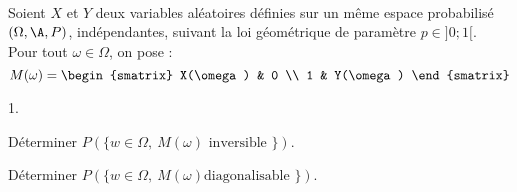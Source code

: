 \documentclass[11pt]{article}%
\begin{document}
\begin{exerciceSP}~\\
  Soient $X$ et $Y$ deux variables aléatoires définies sur un même
  espace probabilisé $(\Omega , \A , P)$, indépendantes, suivant la
  loi géométrique de paramètre $p \in ] 0 ; 1[$. \\
  Pour tout $\omega \in \Omega$, on pose :
  \[
 M(\omega) = 
 \begin{smatrix} 
   X(\omega) & 0 \\ 
   1 & Y(\omega) 
 \end{smatrix}
 \] 
 \begin{noliste}{1.}
    \setlength{\itemsep}{2mm}
  \item Déterminer $P( \{ w \in \Omega,\ M(\omega) \text{ inversible } \} )$.
  \item Déterminer $P( \{ w \in \Omega,\ M(\omega) \text{
      diagonalisable } \} )$.
  \end{noliste}
\end{exerciceSP}


\newpage
\end{document}
